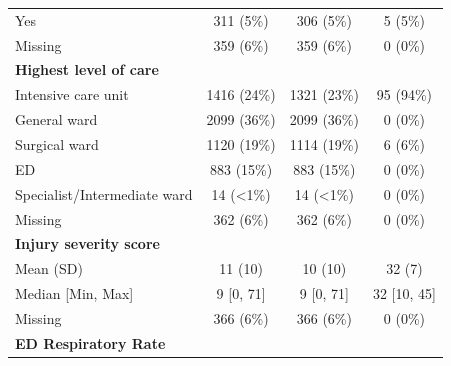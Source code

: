 \documentclass[12pt, a4paper]{article}
\begin{document}
\begin{appendices}
\begin{table}[t!]
{\begin{tabular}{lccc}
                \hspace{3mm}Yes                               & 311 (5\%)         & 306 (5\%)         & 5 (5\%)       \\
                \hspace{3mm}Missing                           & 359 (6\%)         & 359 (6\%)         & 0 (0\%)       \\
                \textbf{Highest level of care}                &                   &                   &               \\
                \hspace{3mm}Intensive care unit               & 1416 (24\%)       & 1321 (23\%)       & 95 (94\%)     \\
                \hspace{3mm}General ward                      & 2099 (36\%)       & 2099 (36\%)       & 0 (0\%)       \\
                \hspace{3mm}Surgical ward                     & 1120 (19\%)       & 1114 (19\%)       & 6 (6\%)       \\
                \hspace{3mm}ED                                & 883 (15\%)        & 883 (15\%)        & 0 (0\%)       \\
                \hspace{3mm}Specialist/Intermediate ward      & 14 (\textless1\%) & 14 (\textless1\%) & 0 (0\%)       \\
                \hspace{3mm}Missing                           & 362 (6\%)         & 362 (6\%)         & 0 (0\%)       \\
                \textbf{Injury severity score}                &                   &                   &               \\
                \hspace{3mm}Mean (SD)                         & 11 (10)           & 10 (10)           & 32 (7)        \\
                \hspace{3mm}Median [Min, Max]                 & 9 [0, 71]         & 9 [0, 71]         & 32 [10, 45]   \\
                \hspace{3mm}Missing                           & 366 (6\%)         & 366 (6\%)         & 0 (0\%)       \\
                \textbf{ED Respiratory Rate}                  &                   &                   &               \\

\end{tabular}}
\end{table}
\end{appendices}
\end{document}
